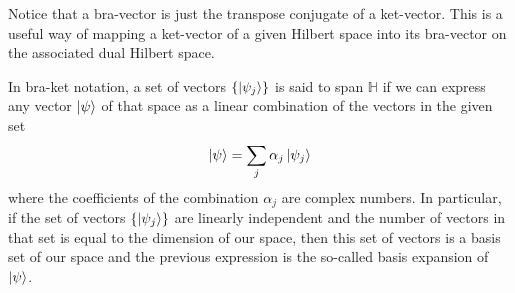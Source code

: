 Notice that a bra-vector is just the transpose conjugate of a ket-vector. This is a useful way of mapping a ket-vector of a given Hilbert space into its bra-vector on the associated dual Hilbert space.

\begin{corollary}
    In bra-ket notation, a set of vectors $\{\ket{\psi_{j}}\}$ is said to span $\mathbb{H}$ if we can express any vector $\ket{\psi}$ of that space as a linear combination of the vectors in the given set
    \begin{equation}
        \ket{\psi} = \sum_{j}\alpha_{j}\ket{\psi_{j}}
    \end{equation}
    where the coefficients of the combination $\alpha_{j}$ are complex numbers. In particular, if the set of vectors $\{\ket{\psi_{j}}\}$ are linearly independent and the number of vectors in that set is equal to the dimension of our space, then this set of vectors is a basis set of our space and the previous expression is the so-called basis expansion of $\ket{\psi}$.
\end{corollary}
